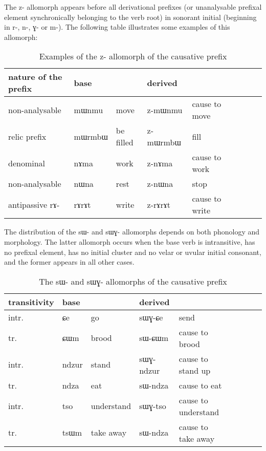 \documentclass[oldfontcommands,oneside,a4paper,11pt]{memoir}
\newcommand{\ipa}[1]{{\phon #1}} %
\begin{document}
The \ipa{z-} allomorph appears before all derivational prefixes (or unanalysable prefixal element synchronically belonging to the verb root) in sonorant initial (beginning in \ipa{r-}, \ipa{n-}, \ipa{ɣ-} or \ipa{m-}). The following table illustrates some examples of this allomorph:

\begin{table}[H]
\caption{Examples of the \ipa{z}- allomorph of the causative prefix}\label{tab:causative.z}
\begin{tabular}{lllllllll} \toprule
nature of the prefix & base  & &derived  \\
\midrule
non-analysable &  \ipa{mɯnmu} &move& \ipa{z-mɯnmu} &cause to move\\
relic prefix &  \ipa{mɯrmbɯ} &be filled& \ipa{z-mɯrmbɯ} &fill\\
denominal &  \ipa{nɤma} &work& \ipa{z-nɤma} &cause to work\\
non-analysable &  \ipa{nɯna} &rest& \ipa{z-nɯna} &stop\\
antipassive \ipa{rɤ-} &  \ipa{rɤrɤt} &write& \ipa{z-rɤrɤt} &cause to write\\

\bottomrule
\end{tabular}
\end{table}

The distribution of the \ipa{sɯ-} and \ipa{sɯɣ-} allomorphs depends on both phonology and morphology. The   latter allomorph occurs when the base verb is intransitive, has no  prefixal element, has no initial cluster and no velar or uvular initial consonant, and the former appears in all other cases.
\begin{table}[H]
\caption{The \ipa{sɯ}- and  \ipa{sɯɣ-} allomorphs of the causative prefix}\label{tab:causative.sW}
\begin{tabular}{lllllllll} \toprule
 transitivity & base & & derived & \\
 \midrule
 intr. & \ipa{ɕe} & go & \ipa{sɯɣ-ɕe} & send \\
  tr. & \ipa{ɕɯm} & brood & \ipa{sɯ-ɕɯm} & cause to brood \\
  intr. & \ipa{ndzur} & stand & \ipa{sɯɣ-ndzur} & cause to stand up \\
  tr. & \ipa{ndza} & eat & \ipa{sɯ-ndza} & cause to eat \\ 
    intr. & \ipa{tso} & understand & \ipa{sɯɣ-tso} & cause to understand \\
  tr. & \ipa{tsɯm} & take away & \ipa{sɯ-ndza} & cause to take away \\ 
 \bottomrule
\end{tabular}
\end{table}
 
\end{document}
